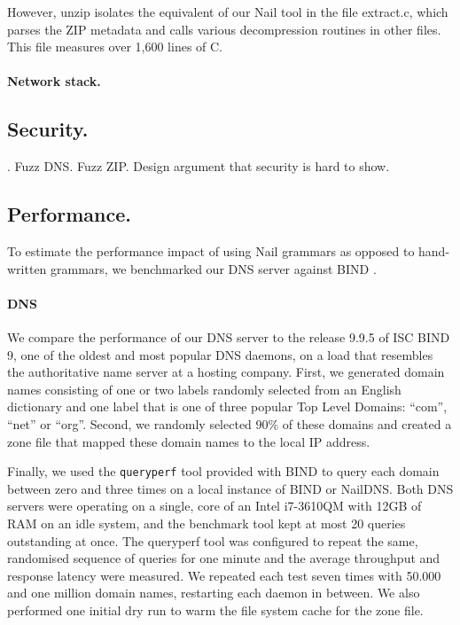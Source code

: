 However, unzip isolates the equivalent of our Nail tool in the file extract.c, which parses the ZIP
metadata and calls various decompression routines in other files. This file measures over 1,600
lines of C. 

\paragraph{Network stack.}
\subsection{Security.} 
 . 
Fuzz DNS. Fuzz ZIP. Design argument that security is hard to show. 

\subsection{Performance.}

To estimate the performance impact of using Nail grammars as opposed to hand-written grammars, we
benchmarked our DNS server against BIND .

\paragraph{DNS}
We compare the performance of our DNS server to the release 9.9.5 of ISC BIND 9\cite{bind8}, one of
the oldest and most popular DNS daemons, on a load that resembles the authoritative name server at a
hosting company. First, we generated domain names consisting of one or
two labels randomly selected from an English dictionary and one label that is one of three popular
Top Level Domains: ``com'', ``net'' or ``org''. Second, we randomly selected 90\% of these domains and
created a zone file that mapped these domain names to the local IP address. 

Finally, we used the \texttt{queryperf} tool provided with BIND to query each domain between zero
and three times on a local instance of BIND or NailDNS. Both DNS servers were operating on a single, 
core  of an Intel i7-3610QM with 12GB of RAM on an idle system, and the benchmark tool kept at most 20
queries outstanding at once. The queryperf tool was configured to
repeat the same, randomised sequence of queries for one minute and the average throughput and
response latency were measured.  We repeated each test seven times  with 50.000 and one million
domain names, restarting each daemon in between. We also performed one initial dry run to warm the
file system cache for the zone file.


